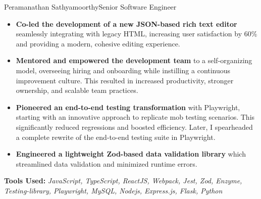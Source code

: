 \documentclass{article}
\begin{document}
\begin{cv}[cvpicture]{Peramanathan Sathyamoorthy}{Senior Software Engineer}
\vspace{1.5em}

\begin{cvevent}[October 2021][December 2022]
    \begin{itemize}
    \setlength{\itemsep}{0.2em}

       \item \textbf{Co-led the development of a new JSON-based rich text editor} seamlessly integrating with legacy HTML, increasing user satisfaction by 60\% and providing a modern, cohesive editing experience.
        \item \textbf{Mentored and empowered the development team} to a self-organizing model, overseeing hiring and onboarding while instilling a continuous improvement culture. This resulted in increased productivity, stronger ownership, and scalable team practices.
        \item \textbf{Pioneered an end-to-end testing transformation} with Playwright, starting with an innovative approach to replicate mob testing scenarios. This significantly reduced regressions and boosted efficiency.
        Later, I spearheaded a complete rewrite of the end-to-end testing suite in Playwright.
        \item \textbf{Engineered a lightweight Zod-based data validation library} which streamlined data validation and minimized runtime errors.
    \end{itemize}
\end{cvevent}
\vspace{1em}

\textbf{Tools Used:} \textit{JavaScript, TypeScript, ReactJS, Webpack, Jest, Zod, Enzyme, Testing-library, Playwright, MySQL, Nodejs, Express.js, Flask, Python}


\end{cv}
\end{document}
